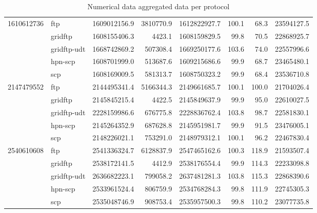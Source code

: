 \documentclass{sig-alternate-05-2015}
\begin{document}
\begin{table}[t]
\begin{tabular}{rlrrrrrr}
	\midrule
	1610612736 &          ftp & 1609012156.9 &  3810770.9 & 1612822927.7 &      100.1 &      68.3 &       23594127.5 \\
	           &      gridftp & 1608155406.3 &     4423.1 & 1608159829.5 &       99.8 &      70.5 &       22868925.7 \\
	           &  gridftp-udt & 1668742869.2 &   507308.4 & 1669250177.6 &      103.6 &      74.0 &       22557996.6 \\
	           &      hpn-scp & 1608701999.0 &   513687.6 & 1609215686.6 &       99.9 &      68.7 &       23465480.1 \\
	           &          scp & 1608169009.5 &   581313.7 & 1608750323.2 &       99.9 &      68.4 &       23536710.8 \\
	\midrule
	2147479552 &          ftp & 2144495341.4 &  5166344.3 & 2149661685.7 &      100.1 &     100.0 &       21704026.4 \\
	           &      gridftp & 2145845215.4 &     4422.5 & 2145849637.9 &       99.9 &      95.0 &       22610027.5 \\
	           &  gridftp-udt & 2228159986.6 &   676775.8 & 2228836762.4 &      103.8 &      98.7 &       22581830.1 \\
	           &      hpn-scp & 2145264352.9 &   687628.8 & 2145951981.7 &       99.9 &      91.5 &       23476005.1 \\
	           &          scp & 2148226021.1 &   753291.0 & 2148979312.1 &      100.1 &      96.2 &       22467830.4 \\
	\midrule
	2540610608 &          ftp & 2541336324.7 &  6128837.9 & 2547465162.6 &      100.3 &     118.9 &       21593507.4 \\
	           &      gridftp & 2538172141.5 &     4412.9 & 2538176554.4 &       99.9 &     114.3 &       22233098.8 \\
	           &  gridftp-udt & 2636682223.1 &   799058.2 & 2637481281.3 &      103.8 &     115.3 &       22868390.6 \\
	           &      hpn-scp & 2533961524.4 &   806759.9 & 2534768284.3 &       99.8 &     111.9 &       22745305.3 \\
	           &          scp & 2535048746.9 &   908753.4 & 2535957500.3 &       99.8 &     110.2 &       23077735.8 \\
	\bottomrule
	\end{tabular}
\caption{Numerical data aggregated data per protocol}
\label{tab:aggregate}
\end{table}



\end{document}
